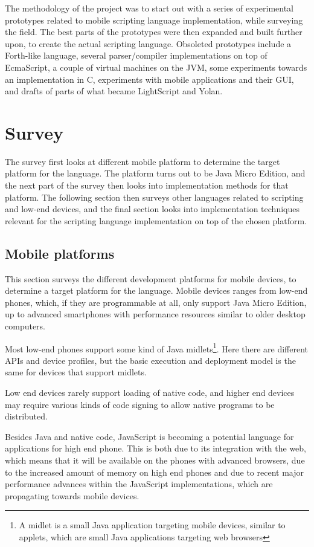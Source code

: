 \documentclass[11pt]{report}
\begin{document}
The methodology of the project was to start out with a series of experimental prototypes related to mobile scripting language implementation, while surveying the field. 
The best parts of the prototypes were then expanded and built further upon, to create the actual scripting language.
Obsoleted prototypes include a Forth-like language, several parser/compiler implementations on top of EcmaScript, a couple of virtual machines on the JVM, some experiments towards an implementation in C, experiments with mobile applications and their GUI, and drafts of parts of what became LightScript and Yolan.


\chapter{Survey}
\label{survey}
The survey first looks at different mobile platform to determine the target platform for the language. 
The platform turns out to be Java Micro Edition, and the next part of the survey then looks into implementation methods for that platform.
The following section then surveys other languages related to scripting and low-end devices, and the final section looks into implementation techniques relevant for the scripting language implementation on top of the chosen platform.

\section{Mobile platforms}
This section surveys the different development platforms for mobile devices, to determine a target platform for the language.
Mobile devices ranges from low-end phones, which, if they are programmable at all, only support Java Micro Edition, up to advanced smartphones with performance resources similar to older desktop computers.

Most low-end phones support some kind of Java midlets\footnote{A midlet is a small Java application targeting mobile devices, similar to applets, which are small Java applications targeting web browsers}.
Here there are different APIs and device profiles, but the basic execution and deployment model is the same for devices that support midlets.

Low end devices rarely support loading of native code, and higher end devices may require various kinds of code signing to allow native programs to be distributed.

Besides Java and native code, JavaScript is becoming a potential language for applications for high end phone. 
This is both due to its integration with the web, which means that it will be available on the phones with advanced browsers, due to the increased amount of memory on high end phones
and due to recent major performance advances within the JavaScript implementations, which are propagating towards mobile devices.
\end{document}
